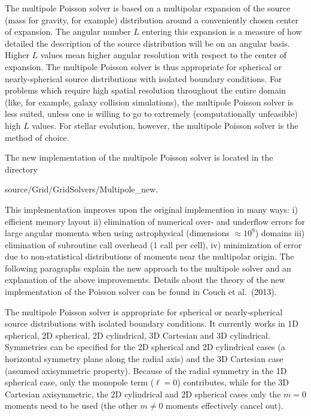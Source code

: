 The multipole Poisson solver is based on a multipolar expansion of the source (mass for gravity,
for example) distribution around a conveniently chosen center of expansion. The angular number
$L$ entering this expansion is a measure of how detailed the description of the source
distribution will be on an angular basis. Higher $L$ values mean higher angular resolution with
respect to the center of expansion. The multipole Poisson solver is thus appropriate for spherical
or nearly-spherical source distributions with isolated boundary conditions. For problems which
require high spatial resolution throughout the entire domain (like, for example, galaxy collision
simulations), the multipole Poisson solver is less suited, unless one is willing to go to extremely
(computationally unfeasible) high $L$ values. For stellar evolution, however, the multipole
Poisson solver is the method of choice.
\par
The new implementation of the multipole Poisson solver is located in the directory
\begin{codeseg}
source/Grid/GridSolvers/Multipole_new.
\end{codeseg}
This implementation improves upon the original implemention in many ways:
i) efficient memory layout 
ii) elimination of numerical over- and underflow
errors for large angular momenta when using astrophysical
(dimensions $\approx 10^9$) domains
iii) elimination of subroutine call overhead (1 call per cell),
iv) minimization of error due to non-statistical distributions of
moments near the multipolar origin. The following paragraphs explain
the new approach to the multipole solver and an explanation of the
above improvements. Details about the theory of the new implementation of the Poisson solver
can be found in Couch et al.~(2013).
\par
The multipole Poisson solver is appropriate for spherical or nearly-spherical
source distributions with isolated boundary conditions. It currently works in
1D spherical, 2D spherical, 2D cylindrical, 3D Cartesian and 3D cylindrical. Symmetries
can be specified for the 2D spherical and 2D cylindrical cases (a horizontal symmetry plane
along the radial axis) and the 3D Cartesian case (assumed axisymmetric property).
Because of the radial symmetry in the 1D spherical case, only the monopole term
($\ell = 0$) contributes, while for the 3D Cartesian axisymmetric, the 2D cylindrical
and 2D spherical cases only the $m = 0$ moments need to be used (the other $m\neq 0$
moments effectively cancel out).
\par
